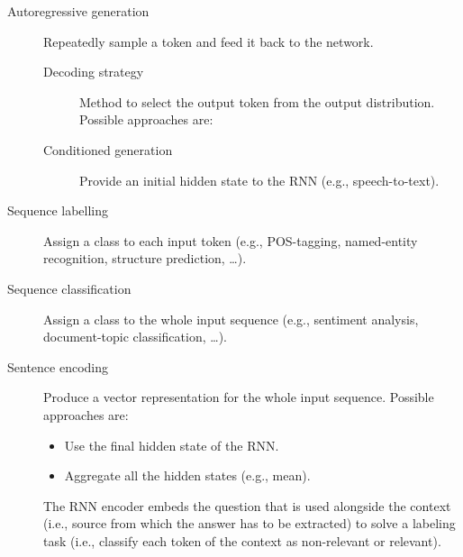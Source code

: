 \begin{description}
    \item[Autoregressive generation] 
        Repeatedly sample a token and feed it back to the network.

        \begin{description}
            \item[Decoding strategy] 
                Method to select the output token from the output distribution. Possible approaches are:
        \end{description}

        \begin{description}
            \item[Conditioned generation] 
                Provide an initial hidden state to the RNN (e.g., speech-to-text).
        \end{description}

    \item[Sequence labelling] 
        Assign a class to each input token (e.g., POS-tagging, named-entity recognition, structure prediction, \dots).

    \item[Sequence classification] 
        Assign a class to the whole input sequence (e.g., sentiment analysis, document-topic classification, \dots).

    \item[Sentence encoding] 
        Produce a vector representation for the whole input sequence.
        Possible approaches are:
        \begin{itemize}
            \item Use the final hidden state of the RNN.
            \item Aggregate all the hidden states (e.g., mean).
        \end{itemize}
    
        \begin{example}
            The RNN encoder embeds the question that is used alongside the context (i.e., source from which the answer has to be extracted) to solve a labeling task (i.e., classify each token of the context as non-relevant or relevant).
        \end{example}
\end{description}
